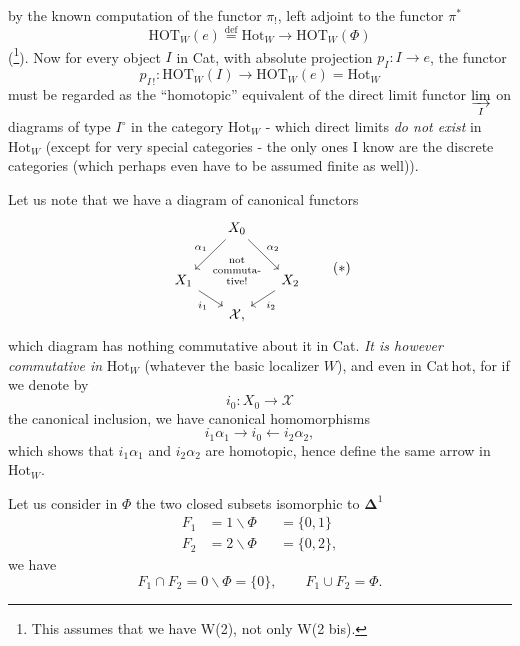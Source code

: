 \documentclass[11pt]{article}
\newcommand{\printedpage}[1]{\marginpar{\footnotesize p.~#1}}
\newcommand{\msp}[1]{\marginpar{\footnotesize [#1]}}
\newcommand{\Hot}{\mathrm{Hot}}
\newcommand{\HOT}{\mathrm{HOT}}
\newcommand{\cX}{\mathcal{X}}
\begin{document}
\printedpage{83}
by the known computation of the functor $\pi_!$, left adjoint to the functor $\pi^*$
\[
\HOT_W(e) \overset{\text{def}}{=} \Hot_W \longrightarrow \HOT_W(\Phi)
\]
(\footnote[84]{This assumes that we have W(2), not only W(2 bis).}). Now for every object $I$ in Cat, with absolute projection $p_I : I \longrightarrow e$, the functor
\[
p_{I\,!} : \HOT_W(I) \longrightarrow \HOT_W(e) = \Hot_W
\]
must be regarded as the ``homotopic'' equivalent of the direct limit functor $\varinjlim\limits_{I}$ on diagrams of type $I^{\circ}$ in the category $\Hot_W$ - which direct limits \textit{do not exist} in $\Hot_W$ (except
\msp{page 123}
for very special categories - the only ones I know are the discrete categories (which perhaps even have to be assumed finite as well)).

Let us note that we have a diagram of canonical functors
\[
\begin{tikzcd}[column sep=tiny, row sep=small, ampersand replacement=\&]
 \& X_0 \arrow[dl, "\alpha_1"'] \arrow[dr, "\alpha_2"] \& \\
X_1 \arrow[dr, "i_1"'] \& {\shortstack{\scriptsize not\\ \scriptsize commuta-\\ \scriptsize tive!}} \& X_2 \arrow[dl, "i_2"] \\
 \& \cX, \&
\end{tikzcd}
\tag*{$(*)$}
\]
which diagram has nothing commutative about it in Cat. \textit{It is however commutative in} $\Hot_W$ (whatever the basic localizer $W$), and even in Cat\,hot, for if we denote by
\[
i_0 : X_0 \longrightarrow \cX
\]
the canonical inclusion, we have canonical homomorphisms
\[
i_1\alpha_1 \longrightarrow i_0 \longleftarrow i_2\alpha_2,
\]
which shows that $i_1\alpha_1$ and $i_2\alpha_2$ are homotopic, hence define the same arrow in $\Hot_W$.

\msp{page 124}
Let us consider in $\Phi$ the two closed subsets isomorphic to $\boldsymbol{\Delta}^1$
\[
\begin{aligned}
F_1 &= 1\backslash\Phi &&= \{0,1\}\\
F_2 &= 2\backslash\Phi &&= \{0,2\},
\end{aligned}
\]
we have
\[
F_1\cap F_2 = 0\backslash\Phi = \{0\}, \qquad F_1\cup F_2 = \Phi.
\]
\end{document}
